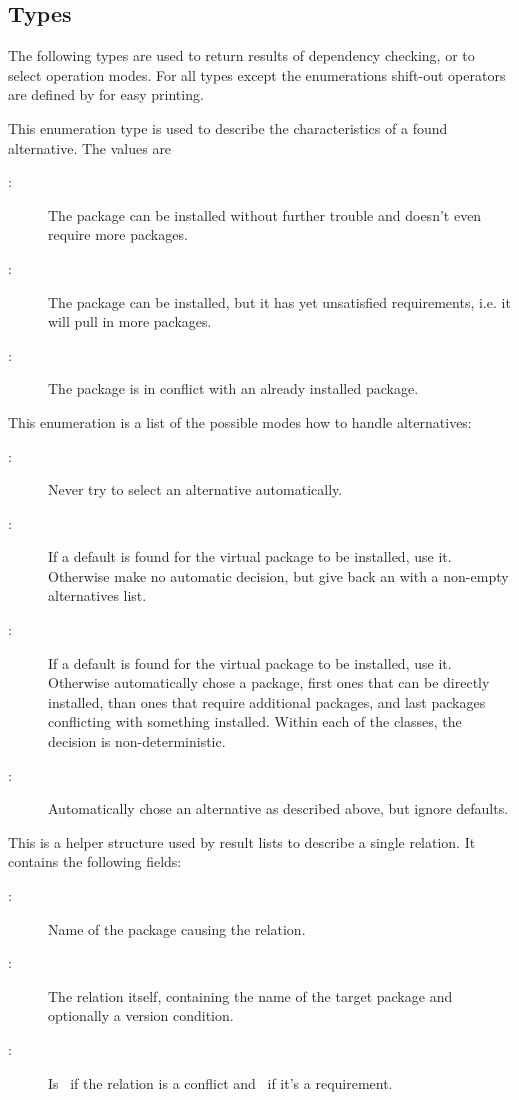 \documentclass[10pt]{article}
\begin{document}
\subsection{Types}

The following types are used to return results of dependency checking,
or  to select operation modes. For all types
except the enumerations shift-out operators are defined by
 for easy printing.

This enumeration type is used to describe the characteristics of a found
alternative. The values are
\begin{description}
\item[:]
  The package can be installed without further trouble and doesn't
  even require more packages.
\item[:]
  The package can be installed, but it has yet unsatisfied
  requirements, i.e. it will pull in more packages.
\item[:]
  The package is in conflict with an already installed package.
\end{description}

This enumeration is a list of the possible modes how to handle
alternatives:
\begin{description}
\item[:]
  Never try to select an alternative automatically.
\item[:]
  If a default is found for the virtual package to be installed, use
  it. Otherwise make no automatic decision, but give back an
   with a non-empty alternatives list.
\item[:]
  If a default is found for the virtual package to be installed, use
  it. Otherwise automatically chose a package, first ones that can be
  directly installed, than ones that require additional packages, and
  last packages conflicting with something installed. Within each of
  the classes, the decision is non-deterministic.
\item[:]
  Automatically chose an alternative as described above, but ignore
  defaults.
\end{description}

This is a helper structure used by result lists to describe a single
relation. It contains the following fields:
\begin{description}
\item[:]
  Name of the package causing the relation.
\item[:]
  The relation itself, containing the name of the target package and
  optionally a version condition.
\item[:]
  Is \true\ if the relation is a conflict and \false\ if it's a
  requirement.
\end{description}
\end{document}
